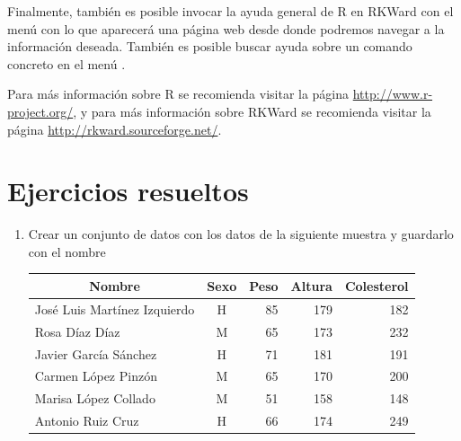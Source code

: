 Finalmente, también es posible invocar la ayuda general de R en RKWard con el menú  con lo
que aparecerá una página web desde donde podremos navegar a la información deseada. También es posible buscar ayuda
sobre un comando concreto en el menú .

Para más información sobre R se recomienda visitar la página \url{http://www.r-project.org/}, y para más información
sobre RKWard se recomienda visitar la página \url{http://rkward.sourceforge.net/}. 

\clearpage
\newpage

\section{Ejercicios resueltos}
\begin{enumerate}[leftmargin=*]
\item Crear un conjunto de datos con los datos de la siguiente muestra y guardarlo con el nombre
\begin{center}
\begin{tabular}{|l|c|r|r|r|}
\hline
\multicolumn{1}{|c|}{Nombre} & \multicolumn{1}{c|}{Sexo} & \multicolumn{1}{c|}{Peso} & \multicolumn{1}{c|}{Altura} & \multicolumn{1}{c|}{Colesterol}\\
\hline
José Luis Martínez Izquierdo  & H &  85 & 179 & 182\\
Rosa Díaz Díaz & M & 65 & 173 & 232\\
Javier García Sánchez  & H & 71 & 181 & 191\\
Carmen López Pinzón & M &  65 & 170 & 200\\
Marisa López Collado & M &  51 & 158 & 148\\
Antonio Ruiz Cruz & H & 66 & 174 & 249\\
\hline
\end{tabular}
\end{center}


\end{enumerate}
